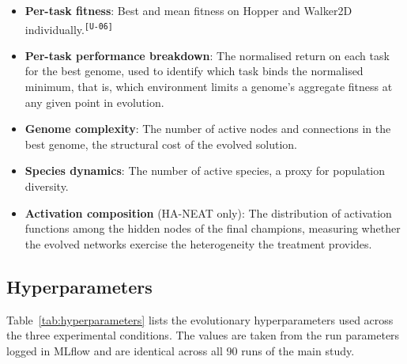 \documentclass[12pt]{article}
\newcommand{\revID}[1]{\textsuperscript{\scriptsize\texttt{[#1]}}}
\newcommand{\revUnclear}[2]{\textcolor{revBlue}{#2}\revID{#1}}
\begin{document}
\begin{itemize}
    \item \revUnclear{U-06}{\textbf{Per-task fitness}: Best and mean fitness on Hopper and Walker2D individually.}
    \item \textbf{Per-task performance breakdown}: The normalised return on each task for the best genome, used to identify which task binds the normalised minimum, that is, which environment limits a genome's aggregate fitness at any given point in evolution.
    \item \textbf{Genome complexity}: The number of active nodes and connections in the best genome, the structural cost of the evolved solution.
    \item \textbf{Species dynamics}: The number of active species, a proxy for population diversity.
    \item \textbf{Activation composition} (HA-NEAT only): The distribution of activation functions among the hidden nodes of the final champions, measuring whether the evolved networks exercise the heterogeneity the treatment provides.
\end{itemize}

\subsection{Hyperparameters}
\label{subsec:hyperparameters}

Table~\ref{tab:hyperparameters} lists the evolutionary hyperparameters used across the three experimental conditions.
The values are taken from the run parameters logged in MLflow and are identical across all 90 runs of the main study.
\end{document}
